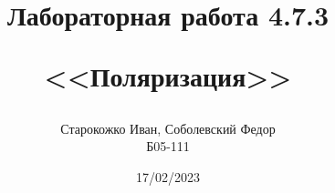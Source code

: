 \documentclass{article}
\begin{document}
\title{Лабораторная работа 4.7.3
\par{<<Поляризация>>}}
\author{Старокожко Иван, Соболевский Федор \\ Б05-111}
\date{17/02/2023}
\maketitle


\end{document}
